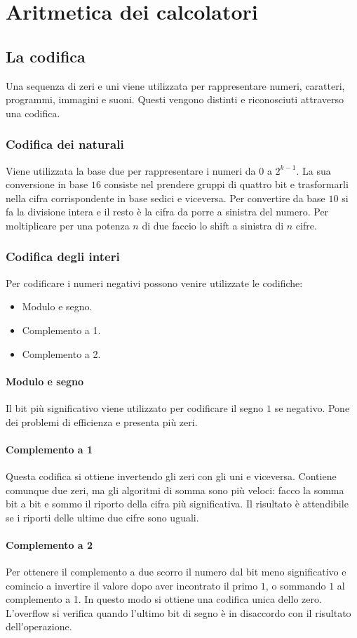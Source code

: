 \chapter{Aritmetica dei calcolatori}
\section{La codifica}
Una sequenza di zeri e uni viene utilizzata per rappresentare numeri, caratteri, programmi, immagini e suoni. Questi vengono distinti e riconosciuti attraverso una codifica.
\subsection{Codifica dei naturali}
Viene utilizzata la base due per rappresentare i numeri da $0$ a $2^{k-1}$. La sua conversione in base $16$ consiste nel prendere gruppi di quattro bit e trasformarli nella 
cifra corrispondente in base sedici e viceversa. Per convertire da base $10$ si fa la divisione intera e il resto \`e la cifra da porre a sinistra del numero. Per moltiplicare
per una potenza $n$ di due faccio lo shift a sinistra di $n$ cifre. 
\subsection{Codifica degli interi}
Per codificare i numeri negativi possono venire utilizzate le codifiche:
\begin{itemize}
\item Modulo e segno.
\item Complemento a 1.
\item Complemento a 2.
\end{itemize}
\subsubsection{Modulo e segno}
Il bit pi\`u significativo viene utilizzato per codificare il segno $1$ se negativo. Pone dei problemi di efficienza e presenta pi\`u zeri.
\subsubsection{Complemento a 1}
Questa codifica si ottiene invertendo gli zeri con gli uni e viceversa. Contiene comunque due zeri, ma gli algoritmi di somma sono pi\`u veloci: facco la somma bit a bit
e sommo il riporto della cifra pi\`u significativa. Il risultato \`e attendibile se i riporti delle ultime due cifre sono uguali.
\subsubsection{Complemento a 2}
Per ottenere il complemento a due scorro il numero dal bit meno significativo e comincio a invertire il valore dopo aver incontrato il primo $1$, o sommando $1$ al complemento 
a 1. In questo modo si ottiene una codifica unica dello zero. L'overflow si verifica quando l'ultimo bit di segno \`e in disaccordo con il risultato dell'operazione.
